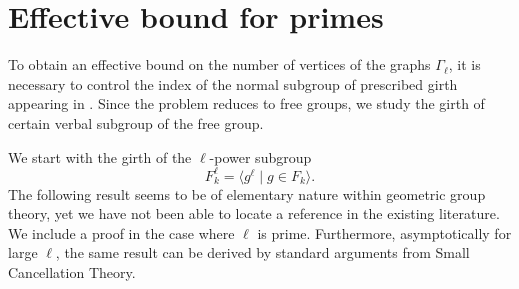 \documentclass[a4paper]{amsart}
\newcommand{\0}{\mathbf{0}}
\theoremstyle{definition}
\begin{document}
\section{Effective bound for primes}
\label{sec: effective}
To obtain an effective bound on the number of vertices of the graphs $\Gamma_\ell$, it is necessary to control the index of the normal subgroup of prescribed girth appearing in . Since the problem reduces to free groups, we study the girth of certain verbal subgroup of the free group.

We start with the girth of the $\ell$-power subgroup
\[ F_k^\ell = \langle g^\ell \mid g \in F_k \rangle.\]
The following result seems to be of   elementary nature within geometric group theory, yet we have not been able to locate a reference in the existing literature. We include a proof in the case where $\ell$ is prime. Furthermore, asymptotically for large $\ell$, the same result can be derived by standard arguments from Small Cancellation Theory.
\end{document}
